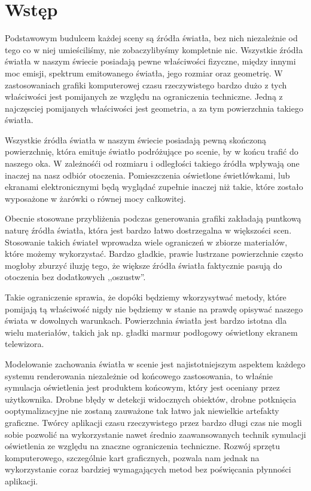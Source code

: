 \documentclass[../main.tex]{subfiles}
\begin{document}
\chapter*{Wstęp}

Podstawowym budulcem każdej sceny są źródła światła, bez nich niezależnie od tego co w niej umieściliśmy, nie zobaczylibyśmy kompletnie nic. Wszystkie źródła światła w naszym świecie posiadają pewne właściwości fizyczne, między innymi moc emisji, spektrum emitowanego światła, jego rozmiar oraz geometrię. W zastosowaniach grafiki komputerowej czasu rzeczywistego bardzo dużo z tych właściwości jest pomijanych ze względu na ograniczenia techniczne. Jedną z najczęsciej pomijanych właściwości jest geometria, a za tym powierzchnia takiego światła.

Wszystkie źródła światła w naszym świecie posiadają pewną skończoną powierzchnię, która emituje światło podróżujące po scenie, by w końcu trafić do naszego oka. W zależnośći od rozmiaru i odległości takiego źródła wpływają one inaczej na nasz odbiór otoczenia. Pomieszczenia oświetlone świetłówkami, lub ekranami elektronicznymi będą wyglądać zupełnie inaczej niż takie, które zostało wyposażone w żarówki o równej mocy całkowitej.

Obecnie stosowane przybliżenia podczas generowania grafiki zakładają puntkową naturę źródła światła, która jest bardzo łatwo dostrzegalna w większości scen. Stosowanie takich świateł wprowadza wiele ograniczeń w zbiorze materiałów, które możemy wykorzystać. Bardzo gładkie, prawie lustrzane powierzchnie często mogłoby zburzyć iluzję tego, że większe źródła światła faktycznie pasują do otoczenia bez dodatkowych ,,oszustw''.

Takie ograniczenie sprawia, że dopóki będziemy wkorzysytwać metody, które pomijają tą właściwość nigdy nie będziemy w stanie na prawdę opisywać naszego świata w dowolnych warunkach. Powierzchnia światła jest bardzo istotna dla wielu materiałów, takich jak np. gładki marmur podłogowy oświetlony ekranem telewizora.

Modelowanie zachowania światła w scenie jest najistotniejszym aspektem każdego systemu renderowania niezależnie od końcowego zastosowania, to właśnie symulacja oświetlenia jest produktem końcowym, który jest oceniany przez użytkownika. Drobne błędy w detekcji widocznych obiektów, drobne potknięcia ooptymalizacyjne nie zostaną zauważone tak łatwo jak niewielkie artefakty graficzne. Twórcy aplikacji czasu rzeczywistego przez bardzo długi czas nie mogli sobie pozwolić na wykorzystanie nawet średnio zaawansowanych technik symulacji oświetlenia ze względu na znaczne ograniczenia techniczne. Rozwój sprzętu komputerowego, szczególnie kart graficznych, pozwala nam jednak na wykorzystanie coraz bardziej wymagających metod bez poświęcania płynności aplikacji.
\end{document}
